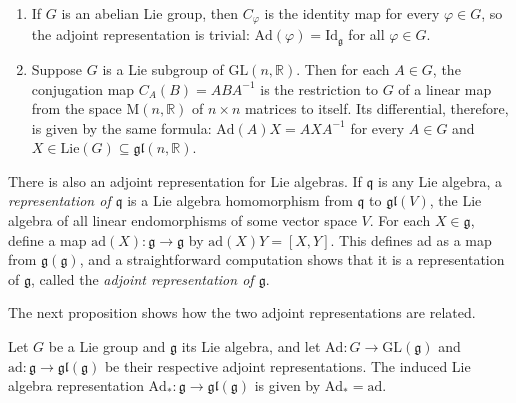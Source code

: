 \begin{example}
\label{ex:adjoint-representations-lie-groups}

\begin{enumerate}
\item[(a)] If $G$ is an abelian Lie group, then $C_\varphi$ is the identity map for every $\varphi \in G$, so the adjoint representation is trivial: $\text{Ad}(\varphi) = \text{Id}_\mathfrak{g}$ for all $\varphi \in G$.

\item[(b)] Suppose $G$ is a Lie subgroup of $\text{GL}(n,\mathbb{R})$. Then for each $A \in G$, the conjugation map $C_A(B) = ABA^{-1}$ is the restriction to $G$ of a linear map from the space $\text{M}(n,\mathbb{R})$ of $n \times n$ matrices to itself. Its differential, therefore, is given by the same formula: $\text{Ad}(A)X = AXA^{-1}$ for every $A \in G$ and $X \in \text{Lie}(G) \subseteq \mathfrak{gl}(n,\mathbb{R})$.
\end{enumerate}

\end{example}

There is also an adjoint representation for Lie algebras. If $\mathfrak{q}$ is any Lie algebra, a \emph{representation of $\mathfrak{q}$} is a Lie algebra homomorphism from $\mathfrak{q}$ to $\mathfrak{gl}(V)$, the Lie algebra of all linear endomorphisms of some vector space $V$. For each $X \in \mathfrak{g}$, define a map $\text{ad}(X): \mathfrak{g} \to \mathfrak{g}$ by $\text{ad}(X)Y = [X, Y]$. This defines ad as a map from $\mathfrak{g}(\mathfrak{g})$, and a straightforward computation shows that it is a representation of $\mathfrak{g}$, called the \emph{adjoint representation of $\mathfrak{g}$}.

The next proposition shows how the two adjoint representations are related.

\begin{proposition}
\label{prop:adjoint-induced-from-group}


Let $G$ be a Lie group and $\mathfrak{g}$ its Lie algebra, and let $\text{Ad}: G \to \text{GL}(\mathfrak{g})$ and $\text{ad}: \mathfrak{g} \to \mathfrak{gl}(\mathfrak{g})$ be their respective adjoint representations. The induced Lie algebra representation $\text{Ad}_*: \mathfrak{g} \to \mathfrak{gl}(\mathfrak{g})$ is given by $\text{Ad}_* = \text{ad}$.

\end{proposition}

